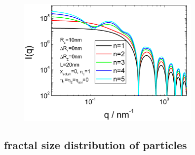 \begin{figure}[htb]
\begin{center}
\includegraphics[width=0.8\textwidth]{../images/form_factor/cluster/TetraHedronDoubleShell.png}
\end{center}
\caption{}
\label{fig:TetrahedronDoubleShell}
\end{figure}


\clearpage
\subsection{fractal size distribution of particles} \hspace{1pt}
\label{sec:ff_fractal_series}

